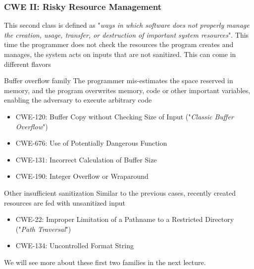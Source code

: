 \subsubsection{CWE II: Risky Resource Management}
This second class is defined as "\textit{ways in which software does not properly manage the creation, usage, transfer, or destruction of important system resources}". This time the programmer does not check the resources the program creates and manages, the system acts on inputs that are not sanitized. This can come in different flavors

\begin{parag}{Buffer overflow family}
    The programmer mis-estimates the space reserved in memory, and the program overwrites memory, code or other important variables, enabling the adversary to execute arbitrary code
    \begin{itemize}
        \item CWE-120: Buffer Copy without Checking Size of Input ("\textit{Classic Buffer Overflow}")
        \item CWE-676: Use of Potentially Dangerous Function
        \item CWE-131: Incorrect Calculation of Buffer Size
        \item CWE-190: Integer Overflow or Wraparound
    \end{itemize}
\end{parag}

\begin{parag}{Other insufficient sanitization}
    Similar to the previous cases, recently created resources are fed with unsanitized input
    \begin{itemize}
        \item CWE-22: Improper Limitation of a Pathname to a Restricted Directory ("\textit{Path Traversal}")
        \item CWE-134: Uncontrolled Format String
    \end{itemize}
\end{parag}

\begin{framedremark}
    We will see more about these first two families in the next lecture.
\end{framedremark}

